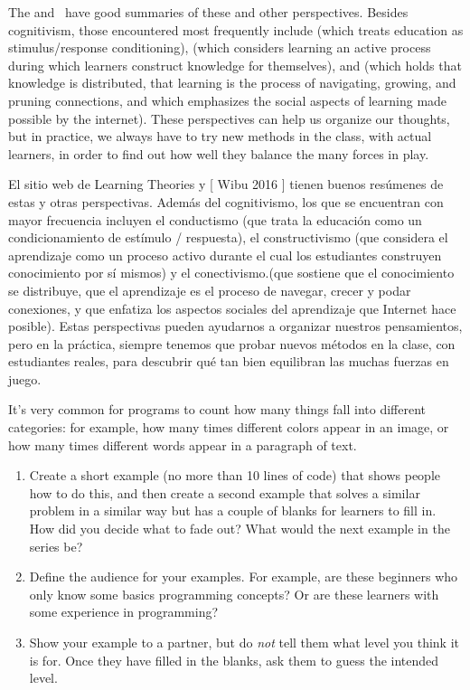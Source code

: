 The 
and~\cite{Wibu2016}
have good summaries of these and other perspectives.
Besides cognitivism,
those encountered most frequently include 
(which treats education as stimulus/response conditioning),
(which considers learning an active process during which learners construct knowledge for themselves),
and 
(which holds that knowledge is distributed,
that learning is the process of navigating, growing, and pruning connections,
and which emphasizes the social aspects of learning made possible by the internet).
These perspectives can help us organize our thoughts,
but in practice,
we always have to try new methods in the class,
with actual learners,
in order to find out how well they balance the many forces in play.

El sitio web de Learning Theories y [ Wibu 2016 ] tienen buenos resúmenes de estas y otras perspectivas. Además del cognitivismo, los que se encuentran con mayor frecuencia incluyen el conductismo (que trata la educación como un condicionamiento de estímulo / respuesta), el constructivismo (que considera el aprendizaje como un proceso activo durante el cual los estudiantes construyen conocimiento por sí mismos) y el conectivismo.(que sostiene que el conocimiento se distribuye, que el aprendizaje es el proceso de navegar, crecer y podar conexiones, y que enfatiza los aspectos sociales del aprendizaje que Internet hace posible). Estas perspectivas pueden ayudarnos a organizar nuestros pensamientos, pero en la práctica, siempre tenemos que probar nuevos métodos en la clase, con estudiantes reales, para descubrir qué tan bien equilibran las muchas fuerzas en juego.



It's very common for programs to count how many things fall into different categories:
for example,
how many times different colors appear in an image,
or how many times different words appear in a paragraph of text.

\begin{enumerate}
\item
  Create a short example (no more than 10 lines of code) that shows people how to do this,
  and then create a second example that solves a similar problem in a similar way
  but has a couple of blanks for learners to fill in.
  How did you decide what to fade out?
  What would the next example in the series be?

\item
  Define the audience for your examples.
  For example,
  are these beginners who only know some basics programming concepts?
  Or are these learners with some experience in programming?

\item
  Show your example to a partner,
  but do \emph{not} tell them what level you think it is for.
  Once they have filled in the blanks,
  ask them to guess the intended level.

\end{enumerate}

